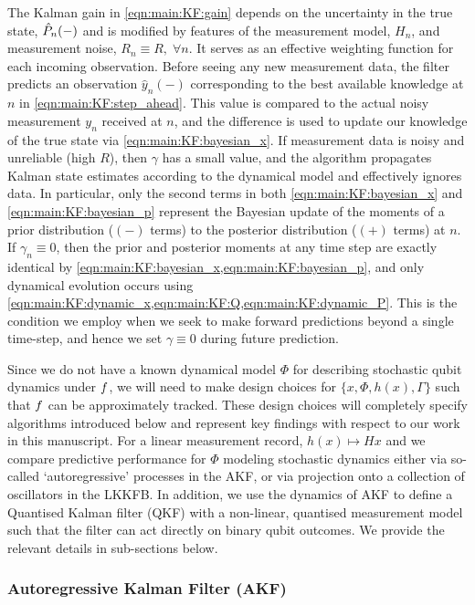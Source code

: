 The Kalman gain in \cref{eqn:main:KF:gain} depends on the uncertainty in the true state, $\hat{P}_{n}(-)$ and is modified by features of the measurement model, $H_n$, and measurement noise, $R_n \equiv R,\; \forall n$. It serves as an effective weighting function for each incoming observation.  Before seeing any new measurement data, the filter predicts an observation $\hat{y}_n(-)$ corresponding to the best available knowledge at $n$ in \cref{eqn:main:KF:step_ahead}. This value is compared to the actual noisy measurement $y_n$ received at $n$, and the difference is used to update our knowledge of the true state via \cref{eqn:main:KF:bayesian_x}. If measurement data is noisy and unreliable (high $R$), then $\gamma$ has a small value, and the algorithm propagates Kalman state estimates according to the dynamical model and effectively ignores data. In particular, only the second terms in both \cref{eqn:main:KF:bayesian_x} and \cref{eqn:main:KF:bayesian_p} represent the Bayesian update of the moments of a prior distribution ($(-)$ terms) to the posterior distribution ($(+)$ terms) at $n$. If $\gamma_n \equiv 0$, then the prior and posterior moments at any time step are exactly identical by \cref{eqn:main:KF:bayesian_x,eqn:main:KF:bayesian_p}, and only dynamical evolution occurs using \cref{eqn:main:KF:dynamic_x,eqn:main:KF:Q,eqn:main:KF:dynamic_P}.  This is the condition we employ when we seek to make forward predictions beyond a single time-step, and hence we set $\gamma \equiv 0$ during future prediction.

Since we do not have a known dynamical model $\Phi$ for describing stochastic qubit dynamics under $f$, we will need to make design choices for  $\{ x, \Phi, h(x), \Gamma \}$  such that $f$ can be approximately tracked. These design choices will completely specify algorithms introduced below and represent key findings with respect to our work in this manuscript. For a linear measurement record, $h(x) \mapsto Hx$ and we compare predictive performance for $\Phi$ modeling stochastic dynamics either via so-called `autoregressive' processes in the AKF, or via projection onto a collection of oscillators in the LKKFB.  In addition, we use the dynamics of AKF to define a Quantised Kalman filter (QKF) with a non-linear, quantised measurement model such that the filter can act directly on binary qubit outcomes. We provide the relevant details in sub-sections below. 
 


\subsubsection{Autoregressive Kalman Filter (AKF)}

